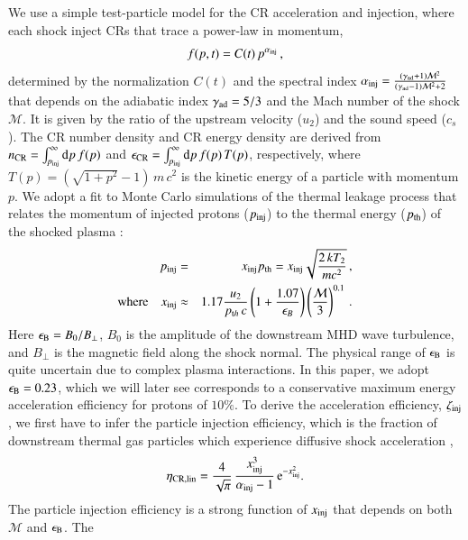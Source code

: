 \documentclass[a4paper,fleqn,usenatbib]{mnras}
\newcommand{\dd}{\mathrm{d}}
\newcommand\eb{\epsilon_\rmn{B}}
\begin{document}
We use a simple test-particle model for the CR acceleration and
injection, where each shock inject CRs that trace a power-law in
momentum,
\begin{equation}
  f(p,t) = C(t)\,p^{\alpha_{\mathrm{inj}}}\,,
\end{equation}
determined by the normalization $C(t)$ and the spectral index
$\alpha_{\mathrm{inj}}=\frac{(\gamma_{\mathrm{ad}}+1)\mathcal{M}^2}{(\gamma_{\mathrm{ad}}-1)\mathcal{M}^2+2}$
that depends on the adiabatic index $\gamma_{\mathrm{ad}} = 5/3$ and the
Mach number of the shock $\mathcal{M}$. It is given by the ratio of
the upstream velocity ($u_2$) and the sound speed ($c_s$). The CR
number density and CR energy density are derived from $n_\rmn{CR} =
\int_{p_\rmn{inj}}^\infty \dd p\, f(p)$ and $\epsilon_\rmn{CR} =
\int_{p_\rmn{inj}}^\infty \dd p\, f(p) \,T(p)$, respectively, where
$T(p) = (\sqrt{1+p^2} -1)\, m\,c^2$ is the kinetic energy of a
particle with momentum $p$. We adopt a fit to Monte Carlo
simulations of the thermal leakage process that relates the momentum
of injected protons ($p_{\mathrm{inj}}$) to the thermal energy
($p_{\mathrm{th}}$) of the shocked plasma \citep{kang11}:
\begin{eqnarray}
  \label{eq:qinj}
  p_{\mathrm{inj}} &=& x_{\mathrm{inj}} p_{\mathrm{th}} = x_{\mathrm{inj}} \sqrt{\frac{2 \,k T_2}{m c^2}}\,, \nonumber \\
  {\mathrm{where}}\quad x_{\mathrm{inj}} &\approx& 1.17 \frac{u_2}{p_{{\mathrm{t}}h}\,c} \left(1+
  \frac{1.07}{\epsilon_B}\right) \left(\frac{\mathcal{M}}{3}\right)^{0.1}\,.
\end{eqnarray}
Here $\eb = B_0/B_{\perp}$, $B_0$ is the amplitude of the downstream
MHD wave turbulence, and $B_{\perp}$ is the magnetic field along the
shock normal. The physical range of $\eb$ is quite uncertain due to
complex plasma interactions. In this paper, we adopt $\eb = 0.23$,
which we will later see corresponds to a conservative maximum energy
acceleration efficiency for protons of $10\%$. To derive the
acceleration efficiency, $\zeta_{\mathrm{inj}}$, we first have to infer the
particle injection efficiency, which is the fraction of downstream
thermal gas particles which experience diffusive shock acceleration
\citep[for details see ][]{pinzke13},
\begin{equation}
  \label{eq:eta}
  \eta_{\mathrm{CR,lin}} =
  \frac{4}{\sqrt{\pi}}\,\frac{x_{\mathrm{inj}}^3}{\alpha_{\mathrm{inj}}-1}\,
  {\mathrm{e}}^{-x_{\mathrm{inj}}^2}.
\end{equation}
The particle injection efficiency is a strong function of
$x_{\mathrm{inj}}$ that depends on both $\mathcal{M}$ and $\eb$. The
\end{document}
